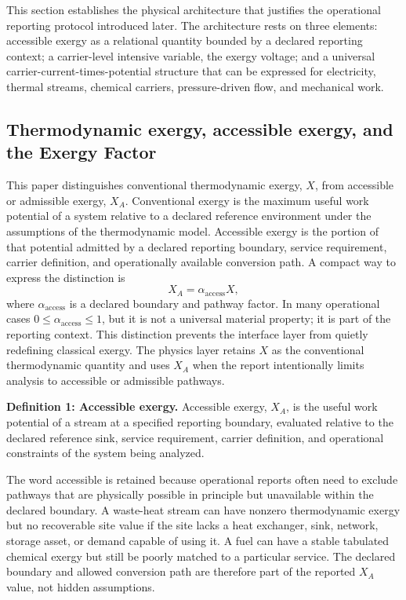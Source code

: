 \documentclass[11pt]{article}
\newcommand{\XA}{X_A}
\begin{document}
This section establishes the physical architecture that justifies the operational reporting protocol introduced later. The architecture rests on three elements: accessible exergy as a relational quantity bounded by a declared reporting context; a carrier-level intensive variable, the exergy voltage; and a universal carrier-current-times-potential structure that can be expressed for electricity, thermal streams, chemical carriers, pressure-driven flow, and mechanical work.

\subsection{Thermodynamic exergy, accessible exergy, and the Exergy Factor}

This paper distinguishes conventional thermodynamic exergy, $X$, from accessible or admissible exergy, $\XA$. Conventional exergy is the maximum useful work potential of a system relative to a declared reference environment under the assumptions of the thermodynamic model. Accessible exergy is the portion of that potential admitted by a declared reporting boundary, service requirement, carrier definition, and operationally available conversion path. A compact way to express the distinction is
\begin{equation}
\XA=\alpha_{\mathrm{access}}X,
\end{equation}
where $\alpha_{\mathrm{access}}$ is a declared boundary and pathway factor. In many operational cases $0\le \alpha_{\mathrm{access}}\le 1$, but it is not a universal material property; it is part of the reporting context. This distinction prevents the interface layer from quietly redefining classical exergy. The physics layer retains $X$ as the conventional thermodynamic quantity and uses $\XA$ when the report intentionally limits analysis to accessible or admissible pathways.

\textbf{Definition 1: Accessible exergy.} Accessible exergy, $\XA$, is the useful work potential of a stream at a specified reporting boundary, evaluated relative to the declared reference sink, service requirement, carrier definition, and operational constraints of the system being analyzed.

The word accessible is retained because operational reports often need to exclude pathways that are physically possible in principle but unavailable within the declared boundary. A waste-heat stream can have nonzero thermodynamic exergy but no recoverable site value if the site lacks a heat exchanger, sink, network, storage asset, or demand capable of using it. A fuel can have a stable tabulated chemical exergy but still be poorly matched to a particular service. The declared boundary and allowed conversion path are therefore part of the reported $\XA$ value, not hidden assumptions.
\end{document}
